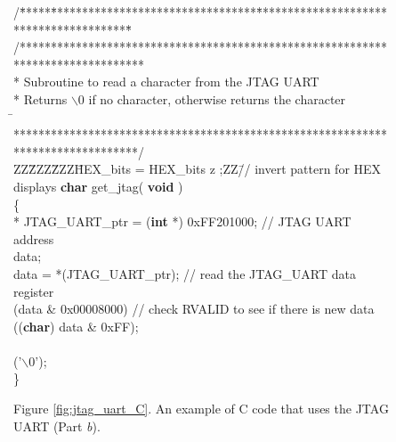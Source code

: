 \begin{figure}[h!]
\begin{center}
\begin{minipage}[t]{12.5 cm}
\begin{tabbing}
/\=*****\=*********************************\=****************************************\=\kill
/********************************************************************************\\
\>* Subroutine to read a character from the JTAG UART\\
\>* Returns $\backslash$0 if no character, otherwise returns the character\\
\=\kill
\>********************************************************************************/\\
ZZ\=ZZZ\=ZZZ\=HEX\_bits = HEX\_bits z ;ZZ\=// invert pattern for HEX displays\kill
{\bf char} get\_jtag( {\bf void} )\\
\{\\
 * JTAG\_UART\_ptr	= ({\bf int} *) 0xFF201000;	// JTAG UART address\\
 data;\\
\>data = *(JTAG\_UART\_ptr); \>\>\>// read the JTAG\_UART data register\\
 (data \& 0x00008000) \>\>\>// check RVALID to see if there is new data\\
\> (({\bf char}) data \& 0xFF);\\
\\
\> ('$\backslash$0');\\
\}
~\\
\centerline{Figure \ref{fig:jtag_uart_C}. An example of C code that uses the JTAG UART (Part {\it b}).}
\end{tabbing}
\end{minipage}
\end{center}
\end{figure}
